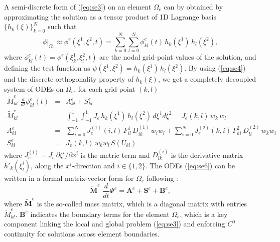 \documentclass{agujournal}
\begin{document}
{  A semi-discrete  form of  (\ref{eq:se3})  on an  element $\Omega_e$ can by obtained by
   approximating the solution  as a tensor product of  1D Lagrange basis  $\{ h_k(\xi)\}_{k=0}^N$ such that
 \begin{equation}
     \phi |_{\Omega_e} \approx  \phi^e(\xi^1,\xi^2,t) =  
              \sum_{k=0}^{N}   \sum_{l=0}^{N}  \phi^e_{kl}(t)  \, h_k(\xi^1) \, h_l(\xi^2),  \label{eq:se60}
 \end{equation}
 where $\phi^e_{kl}(t) = \phi^e(\xi_k^1, \xi_l^2,t) $ are  the nodal grid-point values of the solution, and  defining the  test function as
  $\psi(\xi^1,\xi^2) = h_k(\xi^1) \, h_l(\xi^2)$. By using (\ref{eq:se4}) and the discrete orthogonality property of $h_k(\xi)$, 
  we get a completely decoupled system of ODEs on  $\Omega_e$,  for each grid-point $(k,l)$ 
  \begin{eqnarray}
      \widetilde M^e_{kl}\, \, \frac{d }{dt} \phi^e_{kl}(t) &= &  A^e_{kl}    + S^e_{kl}  \label{eq:se6} \\
        \widetilde M^e_{kl}  &=  & \int_{-1}^{1} \int_{-1}^{1} J_e  \, h_k(\xi^1)  \, h_l(\xi^2) \, d\xi^1  d\xi^2 = J_e(k,l) \, w_k \, w_l \\
          A^e_{kl}  &=  & \sum_{i=0}^N  J^{(1)}_e(i,l) \,  F^1_{i l} \, D_{ik}^{(1)}\, w_i  w_l  +
           \sum_{i=0}^N  J^{(2)}_e(k, i) \,  F^2_{k i} \, D_{l i}^{(2)} \, w_k  w_i \\
           S^e_{kl}  &=   &J_e(k,l) \, w_k w_l  \, S(U_{kl})
  \end{eqnarray}  
   where $J^{(i)}_e = J_e \,\partial \xi^i / \partial x^i$ is the metric term  and 
   $D^{(i)}_{lk}$ is the  derivative matrix $h'_k(\xi^i_l)$, 
  along the $x^i$-direction and  $ i \in \{1,  2\}$.  The ODEs  (\ref{eq:se6}) can be written in a formal matrix-vector form
  for  $\Omega_e$  following
  \cite{KS2013book}: 
 \begin{equation}
    \widetilde{\mathbf{M}}^e\, \, \frac{d }{dt} \Phi^e =   \mathbf{A}^e    + \mathbf{S}^e + \mathbf{B}^e,  \label{eq:se7} 
 \end{equation}
      where $\widetilde{\mathbf{M}}^e$ is the  so-called mass matrix,  which  is a diagonal  matrix with entries $\widetilde M^e_{kl}$.    $\mathbf{B}^e$
  indicates the boundary terms for the element 
  $\Omega_e$, which is a key component linking  the local and global problem (\ref{eq:se3}) and enforcing $C^0$ continuity
  for solutions across element boundaries.  
  
}
\end{document}

